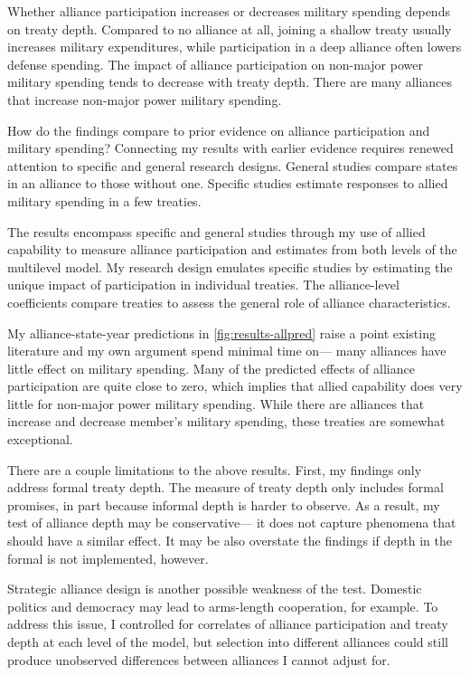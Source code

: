 \documentclass[12pt]{article}
\begin{document}
Whether alliance participation increases or decreases military spending depends on treaty depth. 
Compared to no alliance at all, joining a shallow treaty usually increases military expenditures, while participation in a deep alliance often lowers defense spending. 
The impact of alliance participation on non-major power military spending tends to decrease with treaty depth.
There are many alliances that increase non-major power military spending. 


How do the findings compare to prior evidence on alliance participation and military spending? 
Connecting my results with earlier evidence requires renewed attention to specific and general research designs. 
General studies compare states in an alliance to those without one. 
Specific studies estimate responses to allied military spending in a few treaties. 


The results encompass specific and general studies through my use of allied capability to measure alliance participation and estimates from both levels of the multilevel model. 
My research design emulates specific studies by estimating the unique impact of participation in individual treaties. 
The alliance-level coefficients compare treaties to assess the general role of alliance characteristics.  


My alliance-state-year predictions in \autoref{fig:results-allpred} raise a point existing literature and my own argument spend minimal time on--- many alliances have little effect on military spending. 
Many of the predicted effects of alliance participation are quite close to zero, which implies that allied capability does very little for non-major power military spending. 
While there are alliances that increase and decrease member's military spending, these treaties are somewhat exceptional. 


There are a couple limitations to the above results. 
First, my findings only address formal treaty depth. 
The measure of treaty depth only includes formal promises, in part because informal depth is harder to observe. 
As a result, my test of alliance depth may be conservative--- it does not capture phenomena that should have a similar effect. 
It may be also overstate the findings if depth in the formal is not implemented, however. 


Strategic alliance design is another possible weakness of the test. 
Domestic politics \citep{Davis2004} and democracy \citep{Chibaetal2015} may lead to arms-length cooperation, for example.   
To address this issue, I controlled for correlates of alliance participation and treaty depth at each level of the model, but selection into different alliances could still produce unobserved differences between alliances I cannot adjust for. 
\end{document}
